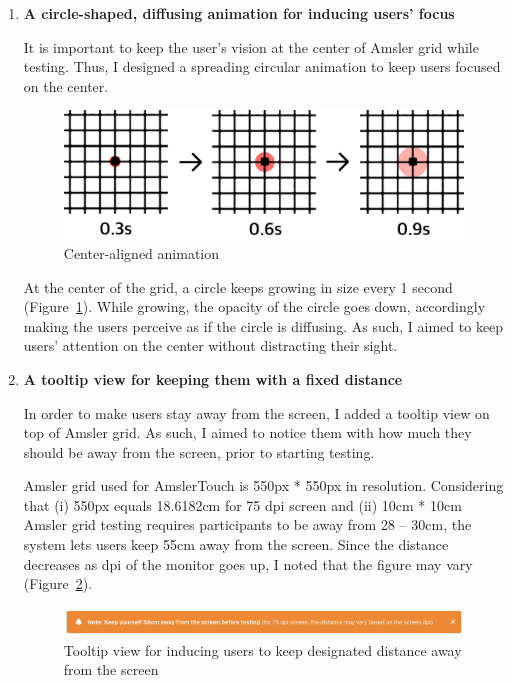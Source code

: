 \begin{enumerate}
    \item \textbf{A circle-shaped, diffusing animation for inducing users' focus}
    
    It is important to keep the user's vision at the center of Amsler grid while testing. Thus, I designed a spreading circular animation to keep users focused on the center.
    
    \begin{figure}[h!]
        \centering
        \includegraphics[width=.7\linewidth]{figure/animation.jpg}
        \caption{Center-aligned animation}
        \label{fig:animation}
    \end{figure}
    
    At the center of the grid, a circle keeps growing in size every 1 second (Figure~\ref{fig:animation}). While growing, the opacity of the circle goes down, accordingly making the users perceive as if the circle is diffusing. As such, I aimed to keep users' attention on the center without distracting their sight.

    \item \textbf{A tooltip view for keeping them with a fixed distance}
    
    In order to make users stay away from the screen, I added a tooltip view on top of Amsler grid. As such, I aimed to notice them with how much they should be away from the screen, prior to starting testing.
    
    Amsler grid used for AmslerTouch is 550px * 550px in resolution. Considering that (i) 550px equals 18.6182cm for 75 dpi screen and (ii) 10cm * 10cm Amsler grid testing requires participants to be away from 28 -- 30cm, the system lets users keep 55cm away from the screen. Since the distance decreases as dpi of the monitor goes up, I noted that the figure may vary (Figure~\ref{fig:tooltip}).
    
    \begin{figure}[h!]
        \centering
        \includegraphics[width=\linewidth]{figure/tooltip.jpg}
        \caption{Tooltip view for inducing users to keep designated distance away from the screen}
        \label{fig:tooltip}
    \end{figure}
\end{enumerate}